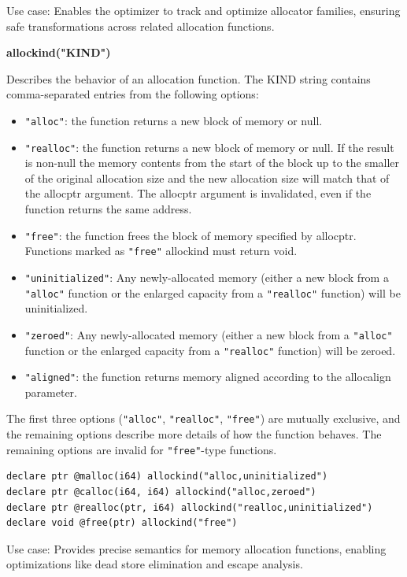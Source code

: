 Use case: Enables the optimizer to track and optimize allocator families, ensuring safe transformations across related allocation functions.

\textbf{allockind("KIND")}

Describes the behavior of an allocation function.
The KIND string contains comma-separated entries from the following options:

\begin{itemize}[noitemsep]
  \item \texttt{"alloc"}: the function returns a new block of memory or null.
  \item \texttt{"realloc"}: the function returns a new block of memory or null.
  If the result is non-null the memory contents from the start of the block up to the smaller of the original allocation size and the new allocation size will match that of the allocptr argument.
  The allocptr argument is invalidated, even if the function returns the same address.
  \item \texttt{"free"}: the function frees the block of memory specified by allocptr. Functions marked as \texttt{"free"} allockind must return void.
  \item \texttt{"uninitialized"}: Any newly-allocated memory (either a new block from a \texttt{"alloc"} function or the enlarged capacity from a \texttt{"realloc"} function) will be uninitialized.
  \item \texttt{"zeroed"}: Any newly-allocated memory (either a new block from a \texttt{"alloc"} function or the enlarged capacity from a \texttt{"realloc"} function) will be zeroed.
  \item \texttt{"aligned"}: the function returns memory aligned according to the allocalign parameter.
\end{itemize}

The first three options (\texttt{"alloc"}, \texttt{"realloc"}, \texttt{"free"}) are mutually exclusive, and the remaining options describe more details of how the function behaves.
The remaining options are invalid for \texttt{"free"}-type functions.

\begin{lstlisting}[style=ir]
declare ptr @malloc(i64) allockind("alloc,uninitialized")
declare ptr @calloc(i64, i64) allockind("alloc,zeroed")
declare ptr @realloc(ptr, i64) allockind("realloc,uninitialized")
declare void @free(ptr) allockind("free")
\end{lstlisting}

Use case: Provides precise semantics for memory allocation functions, enabling optimizations like dead store elimination and escape analysis.

